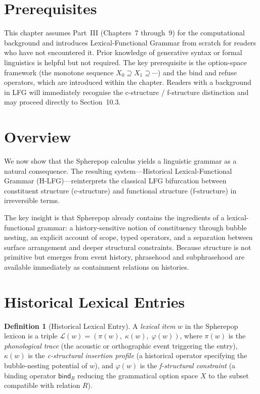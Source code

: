 \documentclass[12pt, oneside]{amsbook}
\theoremstyle{plain}
\theoremstyle{definition}
\newtheorem{definition}[theorem]{Definition}
\theoremstyle{remark}
\newcommand{\bind}{\mathsf{bind}}
\begin{document}
\section{Prerequisites}

This chapter assumes Part~III (Chapters~7 through~9) for the computational background and introduces Lexical-Functional Grammar from scratch for readers who have not encountered it. Prior knowledge of generative syntax or formal linguistics is helpful but not required. The key prerequisite is the option-space framework (the monotone sequence $X_0 \supseteq X_1 \supseteq \cdots$) and the bind and refuse operators, which are introduced within the chapter. Readers with a background in LFG will immediately recognise the c-structure / f-structure distinction and may proceed directly to Section~10.3.

\section{Overview}
\label{sec:hlfg:overview}

We now show that the Spherepop calculus yields a linguistic grammar as a
natural consequence. The resulting system---Historical Lexical-Functional
Grammar (H-LFG)---reinterprets the classical LFG bifurcation between
constituent structure (c-structure) and functional structure (f-structure) in
irreversible terms.

The key insight is that Spherepop already contains the ingredients of a
lexical-functional grammar: a history-sensitive notion of constituency through
bubble nesting, an explicit account of scope, typed operators, and a separation
between surface arrangement and deeper structural constraints. Because structure
is not primitive but emerges from event history, phrasehood and subphrasehood
are available immediately as containment relations on histories.

\section{Historical Lexical Entries}
\label{sec:hlfg:lexicon}

\begin{definition}[Historical Lexical Entry]
\label{def:lex-entry}
  A \emph{lexical item} $w$ in the Spherepop lexicon is a triple
  $\mathcal{L}(w) = (\pi(w),\; \kappa(w),\; \varphi(w))$,
  where $\pi(w)$ is the \emph{phonological trace} (the acoustic or orthographic
  event triggering the entry), $\kappa(w)$ is the \emph{c-structural insertion
  profile} (a historical operator specifying the bubble-nesting potential of
  $w$), and $\varphi(w)$ is the \emph{f-structural constraint} (a binding
  operator $\bind_R$ reducing the grammatical option space $X$ to the subset
  compatible with relation $R$).
\end{definition}
\end{document}

